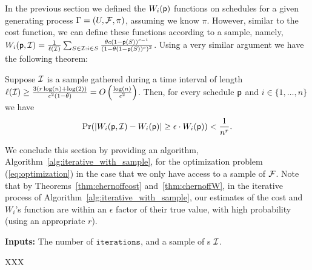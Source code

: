 In the previous section we defined the $W_i(\mathsf{p})$ functions on schedules for a given generating process $\Gamma=(U,\mathcal{F},\pi)$, assuming we know $\pi$. However, similar to the cost function, we can define these functions according to a sample, namely,
$W_i(\mathsf{p},\mathcal{I}) = \frac{1}{\ell(\mathcal{I})}\sum_{S\in \mathcal{I}: i\in S} \frac{\theta c (1-\mathsf{p}(S))^{c-1}}{(1-\theta(1-\mathsf{p}(S))^c)^2}$.
Using a very similar argument we have the following theorem:
\begin{theorem}\label{thm:chernoffW}
 Suppose $\mathcal{I}$ is a sample gathered during a time interval of length
 $\ell(\mathcal{I}) \geq \frac{3(r\log(n)+\log(2))}{\epsilon^2(1-\theta)} =
 O\left(\frac{\log(n)}{\epsilon^2}\right)$. Then, for every schedule $\mathsf{p}$ and
 $i\in\{1,\dots,n\}$ we have
 $$\Pr(|W_i(\mathsf{p},\mathcal{I}) - W_i(\mathsf{p})|\geq \epsilon\cdot W_i(\mathsf{p})) < \frac{1}{n^r}.$$
\end{theorem}

We conclude this section by providing an algorithm, Algorithm~\ref{alg:iterative_with_sample}, for the optimization problem (\ref{eq:optimization}) in the case that we only have access to a sample of $\mathcal{F}$. Note that by Theorems~\ref{thm:chernoffcost} and~\ref{thm:chernoffW}, in the iterative process of Algorithm~\ref{alg:iterative_with_sample}, our estimates of the cost and $W_i$'s function are within an $\epsilon$ factor of their true value, with high probability (using an appropriate $r$).

\begin{algorithm}[!h]
\BlankLine
{\bf Inputs:} The number of  $\texttt{iterations}$, and a sample of {\ins}s $\mathcal{I}$.

\caption{XXX}\label{alg:iterative_with_sample}
\end{algorithm}





